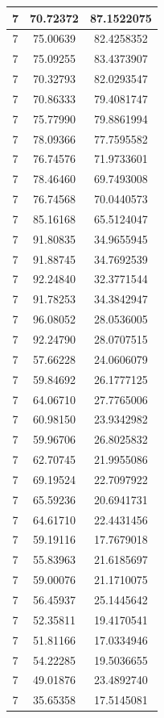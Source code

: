 \documentclass[
]{book}
\begin{document}
\begin{tabular}{c|c|c}
\hline
7 & 70.72372 & 87.1522075\\
\hline
7 & 75.00639 & 82.4258352\\
\hline
7 & 75.09255 & 83.4373907\\
\hline
7 & 70.32793 & 82.0293547\\
\hline
7 & 70.86333 & 79.4081747\\
\hline
7 & 75.77990 & 79.8861994\\
\hline
7 & 78.09366 & 77.7595582\\
\hline
7 & 76.74576 & 71.9733601\\
\hline
7 & 78.46460 & 69.7493008\\
\hline
7 & 76.74568 & 70.0440573\\
\hline
7 & 85.16168 & 65.5124047\\
\hline
7 & 91.80835 & 34.9655945\\
\hline
7 & 91.88745 & 34.7692539\\
\hline
7 & 92.24840 & 32.3771544\\
\hline
7 & 91.78253 & 34.3842947\\
\hline
7 & 96.08052 & 28.0536005\\
\hline
7 & 92.24790 & 28.0707515\\
\hline
7 & 57.66228 & 24.0606079\\
\hline
7 & 59.84692 & 26.1777125\\
\hline
7 & 64.06710 & 27.7765006\\
\hline
7 & 60.98150 & 23.9342982\\
\hline
7 & 59.96706 & 26.8025832\\
\hline
7 & 62.70745 & 21.9955086\\
\hline
7 & 69.19524 & 22.7097922\\
\hline
7 & 65.59236 & 20.6941731\\
\hline
7 & 64.61710 & 22.4431456\\
\hline
7 & 59.19116 & 17.7679018\\
\hline
7 & 55.83963 & 21.6185697\\
\hline
7 & 59.00076 & 21.1710075\\
\hline
7 & 56.45937 & 25.1445642\\
\hline
7 & 52.35811 & 19.4170541\\
\hline
7 & 51.81166 & 17.0334946\\
\hline
7 & 54.22285 & 19.5036655\\
\hline
7 & 49.01876 & 23.4892740\\
\hline
7 & 35.65358 & 17.5145081\\

\end{tabular}
\end{document}
